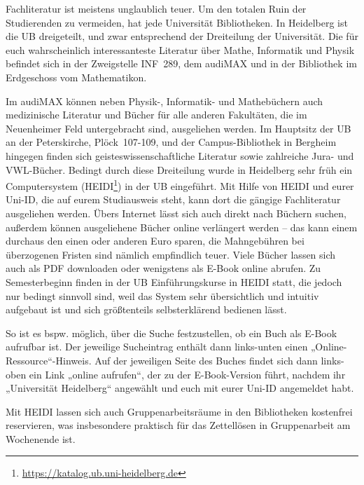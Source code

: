 Fachliteratur ist meistens unglaublich teuer. Um den totalen Ruin der Studierenden zu vermeiden, hat jede Universität Bibliotheken. In Heidelberg ist die \gls{UB} dreigeteilt, und zwar entsprechend der Dreiteilung der Universität. Die für euch wahrscheinlich interessanteste Literatur über Mathe, Informatik und Physik befindet sich in der Zweigstelle \gls{INF}~289, dem \gls{audiMAX} und in der Bibliothek im Erdgeschoss vom \gls{Mathematikon}.


Im audiMAX können neben Physik-, Informatik- und Mathebüchern auch medizinische Literatur und Bücher für alle anderen Fakultäten, die im Neuenheimer Feld untergebracht sind, ausgeliehen werden. Im Hauptsitz der \gls{UB} an der Peterskirche, Plöck~107-109, und der Campus-Bibliothek in Bergheim hingegen finden sich geisteswissenschaftliche Literatur sowie zahlreiche Jura- und VWL-Bücher. Bedingt durch diese Dreiteilung wurde in Heidelberg sehr früh ein Computersystem (\gls{HEIDI}\footnote{\url{https://katalog.ub.uni-heidelberg.de}}) in der UB eingeführt. Mit Hilfe von HEIDI und eurer Uni-ID, die auf eurem Studiausweis steht, kann dort die gängige Fachliteratur ausgeliehen werden. Übers Internet lässt sich auch direkt nach Büchern suchen, außerdem können ausgeliehene Bücher online verlängert werden -- das kann einem durchaus den einen oder anderen Euro sparen, die Mahngebühren bei überzogenen Fristen sind nämlich empfindlich teuer. Viele Bücher lassen sich auch als PDF downloaden oder wenigstens als E-Book online abrufen. Zu Semesterbeginn finden in der UB Einführungskurse in HEIDI statt, die jedoch nur bedingt sinnvoll sind, weil das System sehr übersichtlich und intuitiv aufgebaut ist und sich größtenteils selbsterklärend bedienen lässt.

So ist es bspw. möglich, über die Suche festzustellen, ob ein Buch als E-Book aufrufbar ist. Der jeweilige Sucheintrag enthält dann links-unten einen „Online-Ressource“-Hinweis. Auf der jeweiligen Seite des Buches findet sich dann links-oben ein Link „online aufrufen“, der zu der E-Book-Version führt, nachdem ihr „Universität Heidelberg“ angewählt und euch mit eurer Uni-ID angemeldet habt.

Mit HEIDI lassen sich auch Gruppenarbeitsräume in den Bibliotheken kostenfrei reservieren, was insbesondere praktisch für das Zettellösen in Gruppenarbeit am Wochenende ist.

